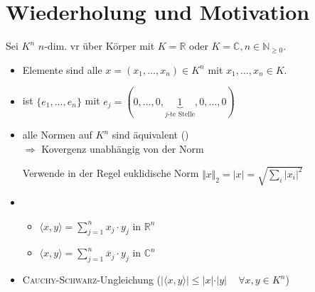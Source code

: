 \addtocounter{section}{15}
\section{Wiederholung und Motivation}
Sei $K^n$ $n$-dim. \gls{vr} über Körper mit $K=\mathbb{R}$ oder $K=\mathbb{C}, n\in\mathbb{N}_{\ge 0}$.
\begin{itemize}
	\item Elemente sind alle $x=(x_1, \dotsc, x_n)\in K^n$ mit $x_1, \dotsc, x_n\in K$.
	\item {} ist $\{e_1, \dotsc, e_n\}$ mit $e_j=(0,\dotsc,0,\underbrace{1}_{\text{$j$-te Stelle}},0,\dotsc,0)$
	\item alle Normen auf $K^n$ sind äquivalent () \\
	$\Rightarrow$ Kovergenz unabhängig von der Norm
	
	Verwende in der Regel euklidische Norm $\Vert x \Vert_2 = \vert x \vert = \sqrt{\sum\limits_{i}\vert x_i \vert^2}$
	\item {}
	\begin{itemize}
		\item $\langle x,y \rangle = \sum\limits_{j=1}^{n} x_j\cdot y_j$ in $\mathbb{R}^n$
		\item $\langle x,y \rangle = \sum\limits_{j=1}^{n} \overline{x}_j\cdot y_j$ in $\mathbb{C}^n$
	\end{itemize}
	\item \textsc{Cauchy}-\textsc{Schwarz}-Ungleichung ($\vert \langle x,y\rangle \vert \le \vert x \vert \cdot \vert y \vert\,\quad\forall x,y\in K^n$)
\end{itemize}

